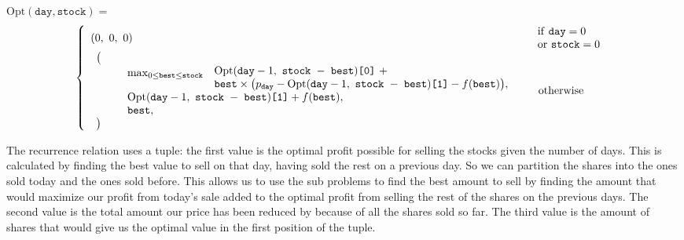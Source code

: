 \documentclass[12pt]{article}
\begin{document}
$\text{Opt}(\texttt{day}, \texttt{stock}) =$
$$
	\left\{
	\begin{array}{ll}
		(0,\ 0,\ 0)                & \hspace*{1.5mm}\begin{array}{l}
			\hspace*{-2mm}\text{if \texttt{day}} = 0 \\
			\hspace*{-2mm}\text{or } \texttt{stock} = 0
		\end{array} \\

		\begin{array}{l}
			\big(                                                                                               \\
			\hspace*{10mm}
			\max_{0 \leq \texttt{best} \leq \texttt{stock}}
			\raisebox{-1.5mm}{
				$
					\begin{array}{l}
						\text{Opt}(\texttt{day}-1,\ \texttt{stock $-$ best})\texttt{[0]}\ + \\
						\texttt{best} \times\big(p_\texttt{day} - \text{Opt}(\texttt{day}-1,\ \texttt{stock $-$ best})\texttt{[1]} - f(\texttt{best})\big),
					\end{array}
				$
			}                                                                                                   \\
			\hspace*{10mm} \text{Opt}(\texttt{day}-1,\ \texttt{stock $-$ best})\texttt{[1]} + f(\texttt{best}), \\
			\hspace*{10mm} \texttt{best},                                                                       \\
			\big)
		\end{array} & \hspace*{1.5mm}\text{otherwise}          \\
	\end{array}
	\right.
$$

The recurrence relation uses a tuple: the first value is the optimal profit possible for selling the stocks given the number of days.
This is calculated by finding the best value to sell on that day, having sold the rest on a previous day.
So we can partition the shares into the ones sold today and the ones sold before. This allows us
to use the sub problems to find the best amount to sell by finding the amount that would maximize
our profit from today's sale added to the optimal profit from selling the rest of the shares on the previous days.
The second value is the total amount our price has been reduced by because of all the shares sold so far.
The third value is the amount of shares that would give us the optimal value in the first position of the tuple.
\end{document}
